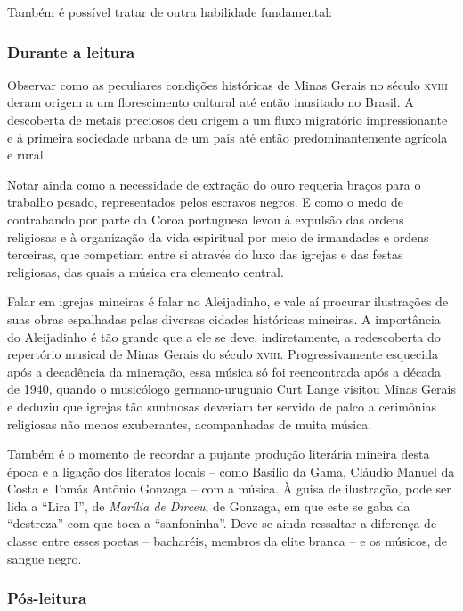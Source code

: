 \documentclass[11pt]{extarticle}
\begin{document}
Também é possível tratar de outra habilidade fundamental:

\subsubsection{Durante a leitura}

  Observar como as peculiares condições históricas de Minas Gerais no século
\textsc{xviii} deram origem a um florescimento cultural até então inusitado no Brasil. A
descoberta de metais preciosos deu origem a um fluxo migratório impressionante
e à primeira sociedade urbana de um país até então predominantemente agrícola e
rural.

Notar ainda como a necessidade de extração do ouro requeria braços para o
trabalho pesado, representados pelos escravos negros. E como o medo de
contrabando por parte da Coroa portuguesa levou à expulsão das ordens
religiosas e à organização da vida espiritual por meio de irmandades e ordens
terceiras, que competiam entre si através do luxo das igrejas e das festas
religiosas, das quais a música era elemento central.

Falar em igrejas mineiras é falar no Aleijadinho, e vale aí procurar
ilustrações de suas obras espalhadas pelas diversas cidades históricas
mineiras. A importância do Aleijadinho é tão grande que a ele se deve,
indiretamente, a redescoberta do repertório musical de Minas Gerais do século
\textsc{xviii}. Progressivamente esquecida após a decadência da mineração, essa música
só foi reencontrada após a década de 1940, quando o musicólogo germano-uruguaio
Curt Lange visitou Minas Gerais e deduziu que igrejas tão suntuosas deveriam
ter servido de palco a cerimônias religiosas não menos exuberantes,
acompanhadas de muita música.

Também é o momento de recordar a pujante produção literária mineira desta
época e a ligação dos literatos locais – como Basílio da Gama, Cláudio Manuel
da Costa e Tomás Antônio Gonzaga – com a música. À guisa de ilustração, pode
ser lida a ``Lira I'', de \emph{Marília de Dirceu}, de Gonzaga, em que este se gaba da
“destreza” com que toca a “sanfoninha”. Deve-se ainda ressaltar a diferença de
classe entre esses poetas – bacharéis, membros da elite branca –  e os músicos,
de sangue negro.

\subsubsection{Pós-leitura}
\end{document}
